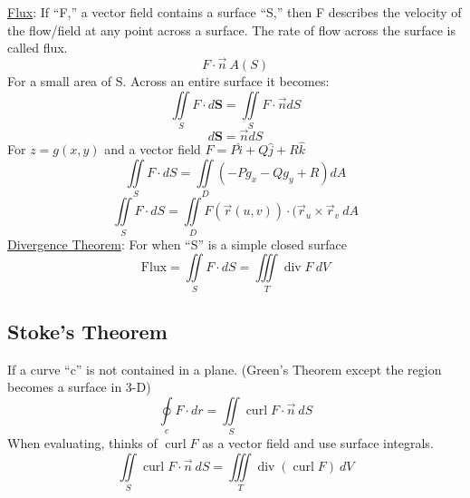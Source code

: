 \documentclass[12pt]{article}
\numberwithin{equation}{subsection}
\DeclareMathOperator{\vdiv}{div}
\DeclareMathOperator{\vcurl}{curl}
\begin{document}
\begin{flushleft}
\underline{Flux}: If ``F,'' a vector field contains a surface ``S,'' then F describes the velocity of the flow/field at any point across a surface. The rate of flow across the surface is called flux. 
\begin{equation}
F \cdot \vec{n}\ A(S)
\end{equation} For a small area of S. Across an entire surface it becomes:
\begin{equation}
\iint \limits_S F \cdot d\textbf{S} = \iint \limits_S F \cdot \vec{n} dS 
\end{equation}
\begin{equation}
d\textbf{S} = \vec{n} dS
\end{equation}
\newpage
For $z=g(x,y)$ and a vector field $F = P\hat{i} + Q\hat{j} + R\hat{k} $
\begin{equation}
\iint \limits_S F \cdot dS = \iint \limits_D  \left( -Pg_x - Qg_y + R\right)dA
\end{equation}
\begin{equation}
\iint \limits_S F \cdot dS = \iint \limits_D F(\vec{r}(u,v)) \cdot (\vec{r}_u \times \vec{r}_v \ dA
\end{equation}
\underline{Divergence Theorem}: For when ``S'' is a simple closed surface
\begin{equation}
\textrm{Flux} = \iint \limits_S F \cdot dS = \iiint \limits_T \vdiv F\ dV
\end{equation}

\subsection{Stoke's Theorem}
If a curve ``c'' is not contained in a plane. (Green's Theorem except the region becomes a surface in 3-D)
\begin{equation}
\oint \limits_c F \cdot dr = \iint \limits_S \vcurl F \cdot \vec{n}\ dS
\end{equation}
When evaluating, thinks of $\vcurl F$ as a vector field and use surface integrals.
\begin{equation}
\iint \limits_S \vcurl F \cdot \vec{n}\ dS = \iiint \limits_T \vdiv \left( \vcurl F \right)\ dV
\end{equation}

\end{flushleft}
\end{document}
